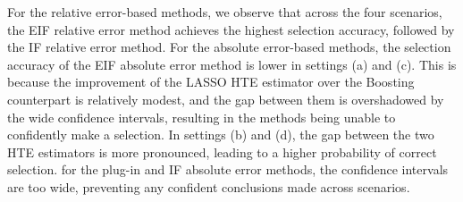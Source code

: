 \documentclass{article}
\theoremstyle{plain}
\theoremstyle{definition}
\theoremstyle{plain}
\begin{document}
For the relative error-based methods, we observe that across the four scenarios, the EIF relative error method achieves the highest selection accuracy, followed by the IF relative error method. 
For the absolute error-based methods, the selection accuracy of the EIF absolute error method is lower in settings (a) and (c). This is because the improvement of the LASSO HTE estimator over the Boosting counterpart is relatively modest, and the gap between them is overshadowed by the wide confidence intervals, resulting in the methods being unable to confidently make a selection. 
In settings (b) and (d), the gap between the two HTE estimators is more pronounced, leading to a higher probability of correct selection. 
for the plug-in and IF absolute error methods, the confidence intervals are too wide, preventing any confident conclusions made across scenarios.
\end{document}
